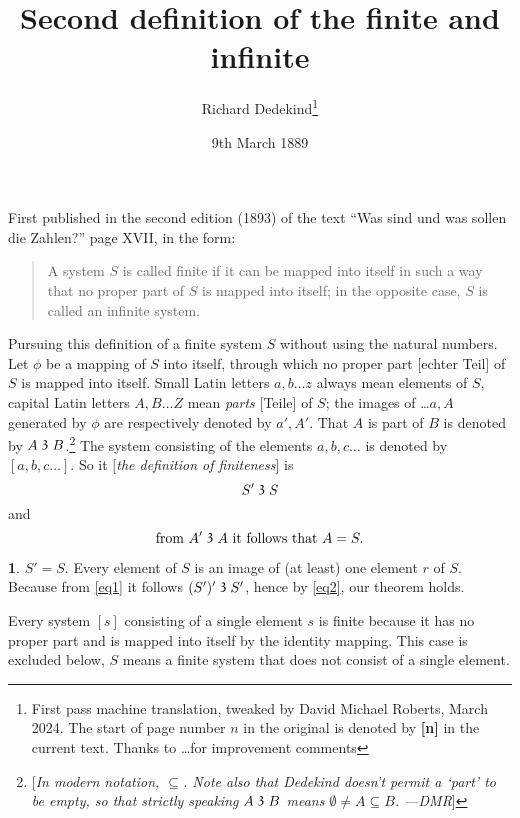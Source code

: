 \documentclass[leqno,hidelinks,a4paper]{article}
\theoremstyle{definition}
\newtheorem{satz}{\protect\satzname}
\newcommand{\satzname}{}
\renewcommand{\satzname}{\hspace{-4pt}.\ Satz}%
\renewcommand{\satzname}{\hspace{-4pt}.\ Theorem}%
\newcommand\partof{\mathrel{\raisebox{0.45ex}{$\mathfrak{3}$}}}
\begin{document}
\title{Second definition of the finite and infinite}
\author{Richard Dedekind\thanks{First pass machine translation, tweaked by David Michael Roberts, March 2024. The start of page number $n$ in the original is denoted by \textbf{[n]} in the current text. Thanks to \ldots for improvement comments}}
\date{9th March 1889}
\maketitle

First published in the second edition (1893) of the text ``Was sind und was sollen die Zahlen?'' page XVII, in the form:

\begin{quote}
A system $S$ is called finite if it can be mapped into itself in such a way that no proper part of $S$ is mapped into itself; in the opposite case, $S$ is called an infinite system.
\end{quote}

Pursuing this definition of a finite system $S$ without using the natural numbers.
Let $\phi$ be a mapping of $S$ into itself, through which no proper part [echter Teil] of $S$ is mapped into itself.
Small Latin letters $a, b \ldots z$ always mean elements of $S$, capital Latin letters $A, B \ldots Z$ mean \emph{parts} [Teile] of $S$; the images of \ldots $a, A$ generated by $\phi$ are respectively denoted by $a', A'$.
That $A$ is part of $B$ is denoted by $A \partof B$.\footnote{[\emph{In modern notation, $\subseteq$. Note also that Dedekind doesn't permit a `part' to be empty, so that strictly speaking $A\partof B$ means $\emptyset \neq A \subseteq B$. ---DMR}]} The system consisting of the elements $a, b, c \ldots $ is denoted by $[a, b, c \ldots]$.
So it [\emph{the definition of finiteness}] is
\begin{equation}\label{eq1}
				S' \partof S
\end{equation}
and
\begin{equation}\label{eq2}
		\text{from } A' \partof A \text{ it follows that } A = S.
\end{equation}

\begin{satz}\label{thm1}
$S' = S$. Every element of $S$ is an image of (at least) one element $r$ of $S$. Because from \eqref{eq1} it follows $(S')' \partof S'$, hence by \eqref{eq2}, our theorem holds.
\end{satz}

Every system $[s]$ consisting of a single element $s$ is finite because it has no proper part and is mapped into itself by the identity mapping.
This case is excluded below, $S$ means a finite system that does not consist of a single element.
\end{document}
